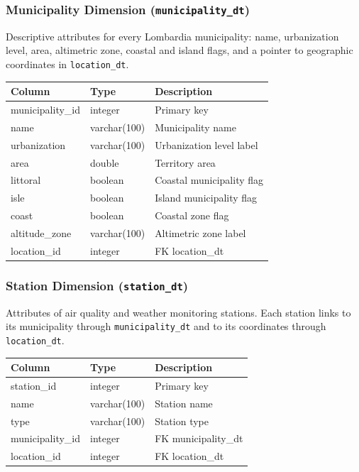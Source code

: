 \documentclass{article}
\begin{document}
	\subsubsection{Municipality Dimension (\textbf{\texttt{municipality\_dt}})}
	
	Descriptive attributes for every Lombardia municipality: name, urbanization level, area, altimetric zone, coastal and island flags, and a pointer to geographic coordinates in \texttt{location\_dt}.
	\begin{table}[H]
		\centering
		\begin{tabular}{lll}
			\hline
			Column & Type & Description \\
			\hline
			municipality\_id & integer & Primary key \\
			name & varchar(100) & Municipality name \\
			urbanization & varchar(100) & Urbanization level label \\
			area & double & Territory area \\
			littoral & boolean & Coastal municipality flag \\
			isle & boolean & Island municipality flag \\
			coast & boolean & Coastal zone flag \\
			altitude\_zone & varchar(100) & Altimetric zone label \\
			location\_id & integer & FK location\_dt \\
			\hline
		\end{tabular}
	\end{table}
	
	\subsubsection{Station Dimension (\textbf{\texttt{station\_dt}})}
	
	Attributes of air quality and weather monitoring stations. Each station links to its municipality through \texttt{municipality\_dt} and to its coordinates through \texttt{location\_dt}.
	\begin{table}[H]
		\centering
		\begin{tabular}{lll}
			\hline
			Column & Type & Description \\
			\hline
			station\_id & integer & Primary key \\
			name & varchar(100) & Station name \\
			type & varchar(100) & Station type \\
			municipality\_id & integer & FK municipality\_dt \\
			location\_id & integer & FK location\_dt \\
			\hline
		\end{tabular}
	\end{table}
	
\end{document}
